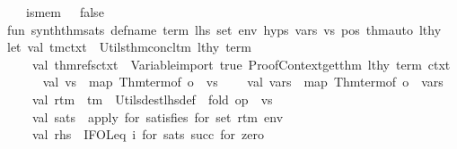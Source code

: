 \begin{isabellebody}
\ \ {\isacharbar}{\kern0pt}\ is{\isacharunderscore}{\kern0pt}mem\ {\isacharunderscore}{\kern0pt}\ {\isacharequal}{\kern0pt}\ false\isanewline
\isanewline
fun\ synth{\isacharunderscore}{\kern0pt}thm{\isacharunderscore}{\kern0pt}sats\ def{\isacharunderscore}{\kern0pt}name\ term\ lhs\ set\ env\ hyps\ vars\ vs\ pos\ thm{\isacharunderscore}{\kern0pt}auto\ lthy\ {\isacharequal}{\kern0pt}\isanewline
let\ val\ {\isacharparenleft}{\kern0pt}{\isacharunderscore}{\kern0pt}{\isacharcomma}{\kern0pt}tm{\isacharcomma}{\kern0pt}ctxt{}{\isacharparenright}{\kern0pt}\ {\isacharequal}{\kern0pt}\ Utils{\isachardot}{\kern0pt}thm{\isacharunderscore}{\kern0pt}concl{\isacharunderscore}{\kern0pt}tm\ lthy\ term\isanewline
\ \ \ \ val\ {\isacharparenleft}{\kern0pt}thm{\isacharunderscore}{\kern0pt}refs{\isacharcomma}{\kern0pt}ctxt{}{\isacharparenright}{\kern0pt}\ {\isacharequal}{\kern0pt}\ Variable{\isachardot}{\kern0pt}import\ true\ {\isacharbrackleft}{\kern0pt}Proof{\isacharunderscore}{\kern0pt}Context{\isachardot}{\kern0pt}get{\isacharunderscore}{\kern0pt}thm\ lthy\ term{\isacharbrackright}{\kern0pt}\ ctxt{}\ {\isacharbar}{\kern0pt}{\isachargreater}{\kern0pt}{\isachargreater}{\kern0pt}\ {\isacharhash}{\kern0pt}{}\isanewline
\ \ \ \ val\ vs{\isacharprime}{\kern0pt}\ {\isacharequal}{\kern0pt}\ map\ {\isacharparenleft}{\kern0pt}Thm{\isachardot}{\kern0pt}term{\isacharunderscore}{\kern0pt}of\ o\ {\isacharhash}{\kern0pt}{}{\isacharparenright}{\kern0pt}\ vs\isanewline
\ \ \ \ val\ vars{\isacharprime}{\kern0pt}\ {\isacharequal}{\kern0pt}\ map\ {\isacharparenleft}{\kern0pt}Thm{\isachardot}{\kern0pt}term{\isacharunderscore}{\kern0pt}of\ o\ {\isacharhash}{\kern0pt}{}{\isacharparenright}{\kern0pt}\ vars\isanewline
\ \ \ \ val\ r{\isacharunderscore}{\kern0pt}tm\ {\isacharequal}{\kern0pt}\ tm\ {\isacharbar}{\kern0pt}{\isachargreater}{\kern0pt}\ Utils{\isachardot}{\kern0pt}dest{\isacharunderscore}{\kern0pt}lhs{\isacharunderscore}{\kern0pt}def\ {\isacharbar}{\kern0pt}{\isachargreater}{\kern0pt}\ fold\ {\isacharparenleft}{\kern0pt}op\ {\isachardollar}{\kern0pt}{\isacharbackquote}{\kern0pt}{\isacharparenright}{\kern0pt}\ vs{\isacharprime}{\kern0pt}\isanewline
\ \ \ \ val\ sats\ {\isacharequal}{\kern0pt}\ \isactrlConst {\isasymopen}apply\ for\ \isactrlConst {\isasymopen}satisfies\ for\ set\ r{\isacharunderscore}{\kern0pt}tm{\isasymclose}\ env{\isasymclose}\isanewline
\ \ \ \ val\ rhs\ {\isacharequal}{\kern0pt}\ \isactrlConst {\isasymopen}IFOL{\isachardot}{\kern0pt}eq\ \isactrlType {\isasymopen}i{\isasymclose}\ for\ sats\ \isactrlConst {\isasymopen}succ\ for\ \isactrlConst {\isasymopen}zero{\isasymclose}{\isasymclose}{\isasymclose}\isanewline

\end{isabellebody}
